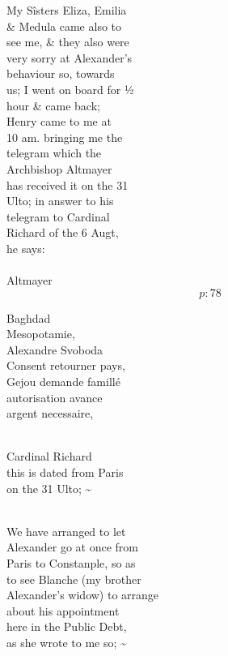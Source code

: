 \documentclass{report}
\begin{document}
	\par{
 	My Sîsters Eliza, Emilia\ \\\& Medula came also to\ \\see me, \& they also were\ \\very sorry at Alexander’s\ \\behaviour so, towards\ \\us; I went on board for ½\ \\hour \& came back;\ \\Henry came to me at\ \\10 am. bringing me the\ \\telegram which the\ \\Archbishop Altmayer\ \\has received it on the 31\ \\Ulto; in answer to his\ \\telegram to Cardinal\ \\Richard of the 6 Augt,\ \\he says:\ \\\ \\Altmayer\ \\
  \[p: 78 \]

	}



	\par{
 	Baghdad\ \\Mesopotamie,\ \\Alexandre Svoboda\ \\Consent retourner pays,\ \\Gejou demande famillé\ \\autorisation avance\ \\argent necessaire,\ \\\ \\
	}

	\par{
 	Cardinal Richard\ \\this is dated from Paris\ \\on the 31 Ulto; \~{}\ \\\ \\
	}

	\par{
 	We have arranged to let\ \\Alexander go at once from\ \\Paris to Constanple, so as\ \\to see Blanche (my brother\ \\Alexander’s widow) to arrange\ \\about his appointment\ \\here in the Public Debt,\ \\as she wrote to me so; \~{}\ \\\ \\
	}
\end{document}
